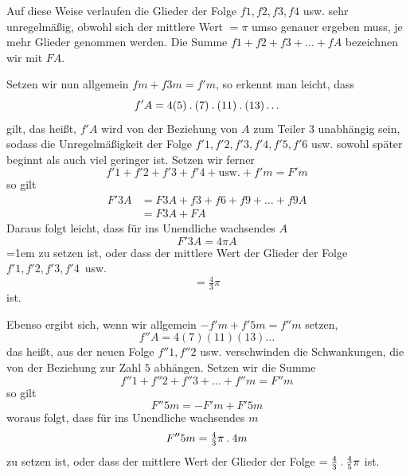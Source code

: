 Auf diese Weise verlaufen die Glieder der Folge $f1,f2,f3,f4$ usw. sehr unregelmäßig, obwohl sich der mittlere Wert $=\pi$ umso genauer ergeben muss, je mehr Glieder genommen werden. Die Summe $f1+f2+f3+\ldots+fA$ bezeichnen wir mit $FA$.

Setzen wir nun allgemein $fm+f3m=f'm$, so erkennt man leicht, dass
\[
f'A=4(5)\mathbin{.}(7)\mathbin{.}(11)\mathbin{.}(13)\ldots
\]
gilt, das heißt, $f'A$ wird von der Beziehung von $A$ zum Teiler $3$ unabhängig sein, sodass die Unregelmäßigkeit der Folge $f'1,f'2,f'3,f'4,f'5,f'6$ usw. sowohl später beginnt als auch viel geringer ist. Setzen wir ferner
\[
f'1+f'2+f'3+f'4+\text{usw.}+f'm=F'm
\]
so gilt
\[
\begin{aligned}
F'3A&=F3A+f3+f6+f9+\ldots+f9A\\
&=F3A+FA
\end{aligned}
\]
Daraus folgt leicht, dass für ins Unendliche wachsendes $A$
\[
F'3A=4\pi A
\]
\begingroup\emergencystretch=1em
zu setzen ist, oder dass der mittlere Wert der Glieder der Folge\hfil\break
\mbox{$f'1,f'2,f'3,f'4$ usw.}
\[
=\tfrac43\pi
\]
ist.
\par\endgroup

Ebenso ergibt sich, wenn wir allgemein $-f'm+f'5m=f''m$ setzen,
\[
f''A=4(7)(11)(13)\ldots
\]
das heißt, aus der neuen Folge $f''1,f''2$ usw. verschwinden die Schwankungen, die von der Beziehung zur Zahl $5$ abhängen. Setzen wir die Summe
\[
f''1+f''2+f''3+\ldots+f''m=F''m
\]
so gilt
\[
F''5m=-F'm+F'5m
\]
woraus folgt, dass für ins Unendliche wachsendes $m$
\[
F''5m=\tfrac43\pi\mathbin{.}4m
\]
zu setzen ist, oder dass der mittlere Wert der Glieder der Folge $=\tfrac43\mathbin{.}\tfrac45\pi$ ist.


